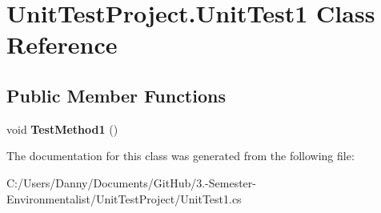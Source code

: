 \hypertarget{class_unit_test_project_1_1_unit_test1}{}\section{Unit\+Test\+Project.\+Unit\+Test1 Class Reference}
\label{class_unit_test_project_1_1_unit_test1}
\subsection*{Public Member Functions}
\begin{DoxyCompactItemize}
\item 
\hypertarget{class_unit_test_project_1_1_unit_test1_a1cd53bf019a6a5ac0422147c8b1434da}{}void {\bfseries Test\+Method1} ()\label{class_unit_test_project_1_1_unit_test1_a1cd53bf019a6a5ac0422147c8b1434da}

\end{DoxyCompactItemize}


The documentation for this class was generated from the following file\+:\begin{DoxyCompactItemize}
\item 
C\+:/\+Users/\+Danny/\+Documents/\+Git\+Hub/3.-\/\+Semester-\/\+Environmentalist/\+Unit\+Test\+Project/Unit\+Test1.\+cs\end{DoxyCompactItemize}
